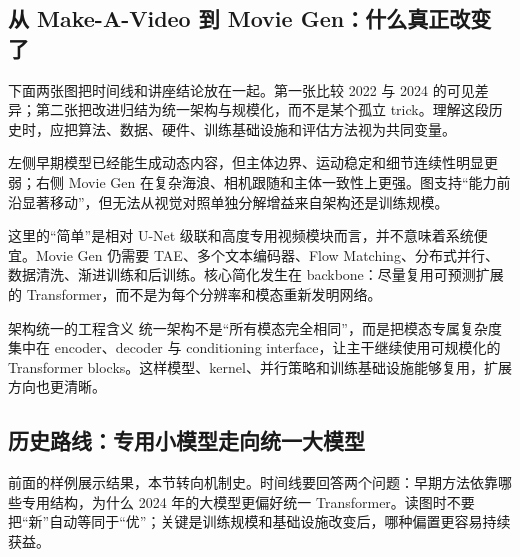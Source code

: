 
\subsection{从 Make-A-Video 到 Movie Gen：什么真正改变了}

下面两张图把时间线和讲座结论放在一起。第一张比较 2022 与 2024 的可见差异；第二张把改进归结为统一架构与规模化，而不是某个孤立 trick。理解这段历史时，应把算法、数据、硬件、训练基础设施和评估方法视为共同变量。


左侧早期模型已经能生成动态内容，但主体边界、运动稳定和细节连续性明显更弱；右侧 Movie Gen 在复杂海浪、相机跟随和主体一致性上更强。图支持“能力前沿显著移动”，但无法从视觉对照单独分解增益来自架构还是训练规模。


这里的“简单”是相对 U-Net 级联和高度专用视频模块而言，并不意味着系统便宜。Movie Gen 仍需要 TAE、多个文本编码器、Flow Matching、分布式并行、数据清洗、渐进训练和后训练。核心简化发生在 backbone：尽量复用可预测扩展的 Transformer，而不是为每个分辨率和模态重新发明网络。

\begin{importantbox}{架构统一的工程含义}
统一架构不是“所有模态完全相同”，而是把模态专属复杂度集中在 encoder、decoder 与 conditioning interface，让主干继续使用可规模化的 Transformer blocks。这样模型、kernel、并行策略和训练基础设施能够复用，扩展方向也更清晰。
\end{importantbox}

\subsection{历史路线：专用小模型走向统一大模型}

前面的样例展示结果，本节转向机制史。时间线要回答两个问题：早期方法依靠哪些专用结构，为什么 2024 年的大模型更偏好统一 Transformer。读图时不要把“新”自动等同于“优”；关键是训练规模和基础设施改变后，哪种偏置更容易持续获益。


